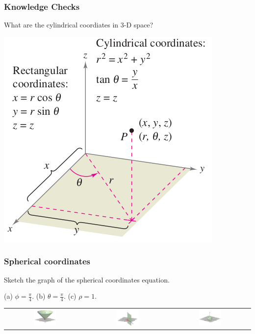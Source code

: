 \documentclass[10pt]{beamer}
\begin{document}
\begin{frame}
\frametitle{Knowledge Checks}
What are the cylindrical coordiates in 3-D space?\pause

\includegraphics[width=.6\textwidth, center]{cylcor.png}
\end{frame}

\begin{frame}
\frametitle{Spherical coordinates}
\begin{example}
Sketch the graph of the spherical coordinates equation.
\begin{center}
 (a) $\displaystyle\phi = \frac{\pi}{4}$. (b) $\displaystyle\theta = \frac{\pi}{4}$. (c) $\rho = 1$.
\end{center}
\end{example}
\pause
\begin{tabular}{ccc}
\includegraphics[width=0.3\textwidth]{sphericalcone.png}&\includegraphics[width=0.3\textwidth]{sphericalplane.png}&\includegraphics[width=0.3\textwidth]{sphere1.png}
\end{tabular}
\end{frame}
\end{document}
